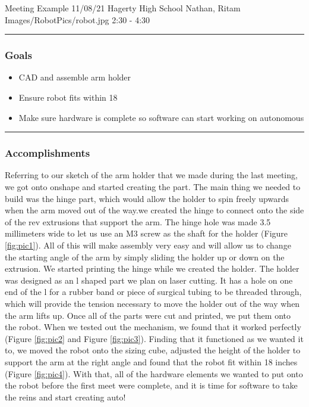 \insertmeeting 
	{Meeting Example} 
	{11/08/21}
	{Hagerty High School}
	{Nathan, Ritam}
	{Images/RobotPics/robot.jpg}
	{2:30 - 4:30}
	
\noindent\hfil\rule{\textwidth}{.4pt}\hfil
\subsubsection*{Goals}
\begin{itemize}
    \item CAD and assemble arm holder
    \item Ensure robot fits within 18
    \item Make sure hardware is complete so software can start working on autonomous
 

\end{itemize} 

\noindent\hfil\rule{\textwidth}{.4pt}\hfil

\subsubsection*{Accomplishments}
Referring to our sketch of the arm holder that we made during the last meeting, we got onto onshape and started creating the part. The main thing we needed to build was the hinge part, which would allow the holder to spin freely upwards when the arm moved out of the way.we created the hinge to connect onto the side of the rev extrusions that support the arm. The hinge hole was made 3.5 millimeters wide to let us use an M3 screw as the shaft for the holder (Figure \ref{fig:pic1}). All of this will make assembly very easy and will allow us to change the starting angle of the arm by simply sliding the holder up or down on the extrusion. We started printing the hinge while we created the holder. The holder was designed as an l shaped part we plan on laser cutting. It has a hole on one end of the l for a rubber band or piece of surgical tubing to be threaded through, which will provide the tension necessary to move the holder out of the way when the arm lifts up. Once all of the parts were cut and printed, we put them onto the robot. When we tested out the mechanism, we found that it worked perfectly (Figure \ref{fig:pic2} and Figure \ref{fig:pic3}). Finding that it functioned as we wanted it to, we moved the robot onto the sizing cube, adjusted the height of the holder to support the arm at the right angle and found that the robot fit within 18 inches (Figure \ref{fig:pic4}). With that, all of the hardware elements we wanted to put onto the robot before the first meet were complete, and it is time for software to take the reins and start creating auto!

